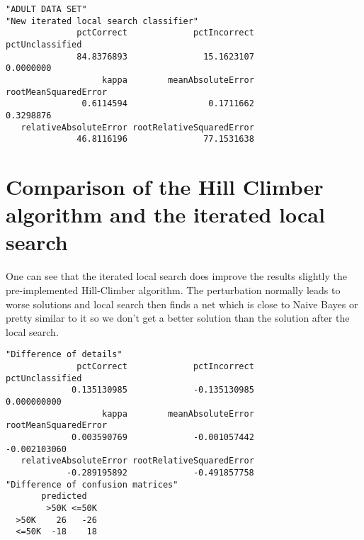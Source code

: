 \documentclass[paper=a4, fontsize=11pt]{scrartcl} %
\numberwithin{equation}{section} %
\numberwithin{figure}{section} %
\numberwithin{table}{section} %
\begin{document}
\begin{lstlisting}[caption={Classification result with iterated local search and Hill Climber},label=listingExtended]
"ADULT DATA SET"
"New iterated local search classifier"
              pctCorrect             pctIncorrect          pctUnclassified 
              84.8376893               15.1623107                0.0000000 
                   kappa        meanAbsoluteError     rootMeanSquaredError 
               0.6114594                0.1711662                0.3298876 
   relativeAbsoluteError rootRelativeSquaredError 
              46.8116196               77.1531638 

\end{lstlisting}





\section{Comparison of the Hill Climber algorithm and the iterated local search}

One can see that the iterated local search does improve the results slightly the pre-implemented Hill-Climber algorithm. The perturbation normally leads to worse solutions and local search then finds a net which is close to Naive Bayes or pretty similar to it so we don't get a better solution than the solution after the local search.

\begin{lstlisting}[caption={Comparison of classification results},label=listingComparison]
"Difference of details"
              pctCorrect             pctIncorrect          pctUnclassified 
             0.135130985             -0.135130985              0.000000000 
                   kappa        meanAbsoluteError     rootMeanSquaredError 
             0.003590769             -0.001057442             -0.002103060 
   relativeAbsoluteError rootRelativeSquaredError 
            -0.289195892             -0.491857758 
"Difference of confusion matrices"
       predicted
        >50K <=50K
  >50K    26   -26
  <=50K  -18    18

\end{lstlisting}



\end{document}
